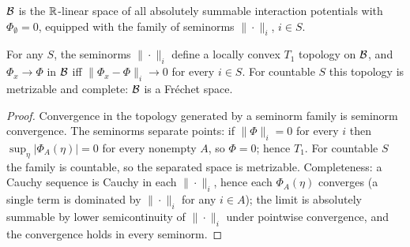 \begin{definition}
    \label{def:pot-bspace}
    \leanok

    $\mathcal{B}$ is the $\mathbb{R}$-linear space of all absolutely summable interaction potentials with
    $\Phi_\emptyset = 0$, equipped with the family of seminorms $\|\cdot\|_i$, $i \in S$.
\end{definition}

\begin{theorem}
    \label{thm:pot-frechet}
    \leanok

    For any $S$, the seminorms $\|\cdot\|_i$ define a locally convex $T_1$ topology on
    $\mathcal{B}$, and $\Phi_x \to \Phi$ in $\mathcal{B}$ iff $\|\Phi_x - \Phi\|_i \to 0$ for every
    $i \in S$. For countable $S$ this topology is metrizable and complete: $\mathcal{B}$ is a
    Fr\'echet space.
\end{theorem}
\begin{proof}
    \leanok

    Convergence in the topology generated by a seminorm family is seminorm convergence. The
    seminorms separate points: if $\|\Phi\|_i = 0$ for every $i$ then $\sup_\eta|\Phi_A(\eta)|
    = 0$ for every nonempty $A$, so $\Phi = 0$; hence $T_1$. For countable $S$ the family is
    countable, so the separated space is metrizable. Completeness: a Cauchy sequence is Cauchy
    in each $\|\cdot\|_i$, hence each $\Phi_A(\eta)$ converges (a single term is dominated by
    $\|\cdot\|_i$ for any $i \in A$); the limit is absolutely summable by lower semicontinuity
    of $\|\cdot\|_i$ under pointwise convergence, and the convergence holds in every seminorm.
\end{proof}

